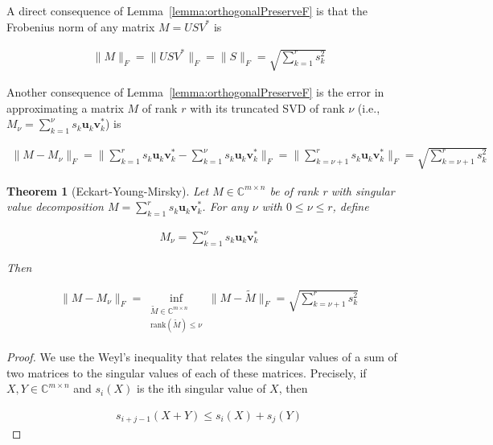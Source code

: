 \documentclass[12pt]{article}
\newtheorem{theorem}{Theorem}
\begin{document}
\begin{appendices}
    A direct consequence of Lemma~\ref{lemma:orthogonalPreserveF} is that the
    Frobenius norm of any matrix $M=USV^*$ is

    \begin{align}
        \|M\|_F=\|USV^*\|_F=\|S\|_F=\sqrt{\sum_{k=1}^rs_k^2}
    \end{align}

    Another consequence of Lemma~\ref{lemma:orthogonalPreserveF} is 
    the error in approximating a matrix $M$ of rank $r$ with its truncated
    SVD of rank $\nu$ (i.e., $M_\nu=\sum_{k=1}^\nu s_k\mathbf{u}_k\mathbf{v}_k^*$) is

    \begin{align}
        \|M-M_\nu\|_F=\|\sum_{k=1}^rs_k\mathbf{u}_k\mathbf{v}_k^*-\sum_{k=1}^\nu
        s_k\mathbf{u}_k\mathbf{v}_k^*\|_F=\|\sum_{k={\nu+1}}^rs_k\mathbf{u}_k\mathbf{v}_k^*\|_F=\sqrt{\sum_{k=\nu+1}^rs_k^2}\label{eq:truncSVDerror}
    \end{align}

    \begin{theorem}[Eckart-Young-Mirsky]
        Let $M\in\mathbb{C}^{m\times n}$ be of rank r with singular value
        decomposition $M=\sum_{k=1}^rs_k\mathbf{u}_k\mathbf{v}_k^*$. For
        any $\nu$ with $0\leq\nu\leq r$, define

        
        \begin{align}
            M_\nu=\sum_{k=1}^\nu s_k\mathbf{u}_k\mathbf{v}_k^*
        \end{align}

        Then

        \begin{align}
            \|M-M_\nu\|_F=\inf_{\substack{\tilde{M}\in\mathbb{C}^{m\times n}\\\text{rank}(\tilde{M})\leq\nu}}\|M-\tilde{M}\|_F=\sqrt{\sum_{k=\nu+1}^rs_k^2}\label{eq:errorFNorm}
        \end{align}

        \label{thm:eckart-young-mirsky}
    \end{theorem}

    \begin{proof}
        We use the Weyl's inequality that relates the singular values of a sum
        of two matrices to the singular values of each of these matrices.
        Precisely, if $X,Y\in\mathbb{C}^{m\times n}$ and $s_i(X)$ is the ith
        singular value of $X$, then

        \begin{align}
            s_{i+j-1}(X+Y)\leq s_i(X)+s_j(Y)
            \label{eq:weylsInequality}
        \end{align}


\end{proof}
\end{appendices}
\end{document}
